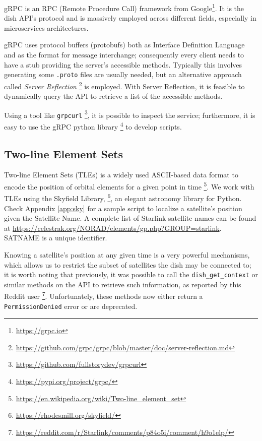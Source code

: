 \documentclass[IN,11pt,twoside,openright,idp,english]{tumthesis}
\begin{document}
gRPC is an RPC (Remote Procedure Call) framework from Google\footnote{\url{https://grpc.io}}. It is the dish API's protocol and is massively employed across different fields, especially in microservices architectures. 
    
gRPC uses protocol buffers (protobufs) both as Interface Definition Language and as the format for message interchange; consequently every client needs to have a stub providing the server's accessible methods. Typically this involves generating some \texttt{.proto} files are usually needed, but an alternative approach called \textit{Server Reflection} \footnote{\url{https://github.com/grpc/grpc/blob/master/doc/server-reflection.md}} is employed. With Server Reflection, it is feasible to dynamically query the API to retrieve a list of the accessible methods.

Using a tool like \texttt{grpcurl} \footnote{\url{https://github.com/fullstorydev/grpcurl}}, it is possible to inspect the service; furthermore, it is easy to use the gRPC python library \footnote{\url{https://pypi.org/project/grpc/}} to develop scripts.
    
\subsection{Two-line Element Sets}
    
Two-line Element Sets (TLEs) is a widely used ASCII-based data format to encode the position of orbital elements for a given point in time \footnote{\url{https://en.wikipedia.org/wiki/Two-line_element_set}}. We work with TLEs using the Skyfield Library, \footnote{\url{https://rhodesmill.org/skyfield/}}, an elegant astronomy library for Python. Check Appendix \ref{app:sky} for a sample script to localize a satellite's position given the Satellite Name. A complete list of Starlink satellite names can be found at \url{https://celestrak.org/NORAD/elements/gp.php?GROUP=starlink}. 
SATNAME is a unique identifier.
    
Knowing a satellite's position at any given time is a very powerful mechanisms, which allows us to restrict the subset of satellites the dish may be connected to; it is worth noting that previously, it was possible to call the \texttt{dish\_get\_context} or similar methods on the API to retrieve such information, as reported by this Reddit user \footnote{\url{https://reddit.com/r/Starlink/comments/p84o5i/comment/h9o1elp/}}. Unfortunately, these methods now either return a \texttt{PermissionDenied} error or are deprecated.
    
\end{document}
